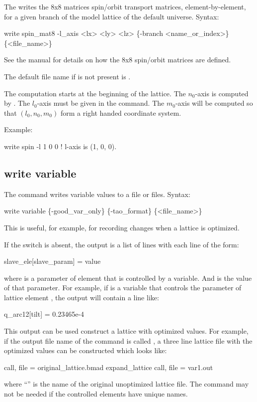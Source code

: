 {{{{{{{{{{{The  writes the 8x8 matrices spin/orbit transport matrices, element-by-element, for
a given branch of the model lattice of the default universe.
Syntax:
\begin{example}
  write spin_mat8 -l_axis <lx> <ly> <lz> \{-branch <name_or_index>\} \{<file_name>\}
\end{example}
See the \bmad manual for details on how the 8x8 spin/orbit matrices are defined. 

The default file name if  is not present is .

The computation starts at the beginning of the lattice. The $n_0$-axis is computed by \bmad. The
$l_0$-axis must be given in the  command.  The $m_0$-axis will be computed so
that $(l_0, n_0, m_0)$ form a right handed coordinate system.

Example:
\begin{example}
  write spin -l 1 0 0    ! l-axis is (1, 0, 0).
\end{example}


\subsection{write variable}
\label{s:write.variable}

The  command writes \tao variable values to a file or files.
Syntax:
\begin{example}
  write variable \{-good_var_only\} \{-tao_format\} \{<file_name>\} 
\end{example}
This is useful, for example, for recording changes when a lattice is optimized.

If the  switch is absent, the output is a list of lines with each line of the form:
\begin{example}
  slave_ele[slave_param] = value
\end{example}
where  is a parameter of \bmad element  that is controlled by a \tao
variable. And  is the value of that parameter. For example, if  is a \tao
variable that controls the  parameter of \bmad lattice element , the output
will contain a line like:
\begin{example}
  q_arc12[tilt] = 0.23465e-4
\end{example}
This output can be used construct a lattice with optimized values. For example, if the output file
name of the  command is called , a three line lattice file with the
optimized values can be constructed which looks like:
\begin{example}
  call, file = original_lattice.bmad
  expand_lattice
  call, file = var1.out
\end{example}
where ``'' is the name of the original unoptimized lattice file. The
 command may not be needed if the controlled \bmad elements have unique names.

}}}}}}}}}}}

